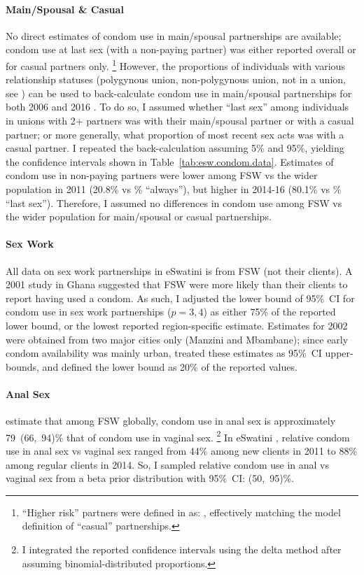 \paragraph{Main/Spousal \& Casual}
No direct estimates of condom use in main/spousal partnerships are available;
condom use at last sex (with a non-paying partner)
was either reported overall or for casual partners only.%
\footnote{``Higher risk'' partners were defined in \cite{SDHS2006} as:
  ,
    effectively matching the model definition of ``casual'' partnerships.}
However, the proportions of individuals with various relationship statuses
(\eg polygynous union, non-polygynous union, not in a union, see )
can be used to back-calculate condom use in main/spousal partnerships
for both 2006 \cite{SDHS2006} and 2016 \cite{SHIMS2}.
To do so, I assumed whether ``last sex'' among individuals in unions with 2+ partners
was with their main/spousal partner or with a casual partner;
or more generally, what proportion of most recent sex acts was with a casual partner.
I repeated the back-calculation assuming 5\% and 95\%,
yielding the confidence intervals shown in Table~\ref{tab:esw.condom.data}.
Estimates of condom use in non-paying partners were
lower among FSW vs the wider population in 2011 (20.8\% vs \% ``always''), but
higher in 2014-16 (80.1\% vs \% ``last sex'').
Therefore, I assumed no differences in condom use
among FSW vs the wider population for main/spousal or casual partnerships.
\paragraph{Sex Work}
All data on sex work partnerships in eSwatini is from FSW (\ie not their clients).
A 2001 study in Ghana \cite{Cote2004} suggested that
FSW were more likely than their clients to report having used a condom.
As such, I adjusted the lower bound of 95\%~CI for condom use in sex work partnerships ($p=3,4$)
as either 75\% of the reported lower bound, or the lowest reported region-specific estimate.
Estimates for 2002 \cite{SBSS2002} were obtained from two major cities only (Manzini and Mbambane);
since early condom availability was mainly urban,
treated these estimates as 95\%~CI upper-bounds,
and defined the lower bound as 20\% of the reported values.
\paragraph{Anal Sex}
\citet{Owen2020a} estimate that among FSW globally,
condom use in anal sex is approximately 79~(66,~94)\% that of condom use in vaginal sex.%
\footnote{I integrated the reported confidence intervals using the delta method
  after assuming binomial-distributed proportions.}
In eSwatini \cite{Baral2014,EswKP2014}, relative condom use in anal sex vs vaginal sex
ranged from 44\% among new clients in 2011 to 88\% among regular clients in 2014.
So, I sampled relative condom use in anal vs vaginal sex from a beta prior distribution
with 95\%~CI: (50,~95)\%.
